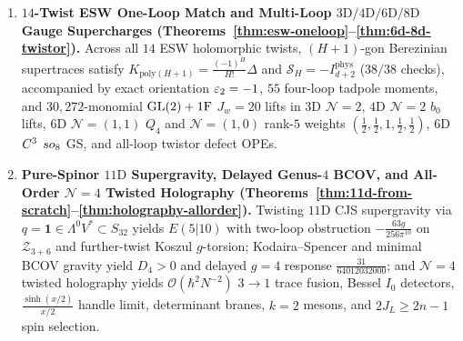\begin{enumerate}[label=\textbf{Result~\arabic*.},leftmargin=*]
  \item \textbf{$14$-Twist ESW One-Loop Match and Multi-Loop $3\mathrm{D}/4\mathrm{D}/6\mathrm{D}/8\mathrm{D}$ Gauge Supercharges (Theorems~\ref{thm:esw-oneloop}--\ref{thm:6d-8d-twistor}).} Across all $14$ ESW holomorphic twists, $(H+1)$-gon Berezinian supertraces satisfy $K_{\mathrm{poly}(H+1)} = \frac{(-1)^H}{H!}\Delta$ and $\mathcal{S}_H = -I^{\mathrm{phys}}_{d+2}$ ($38/38$ checks), accompanied by exact orientation $\varepsilon_2 = -1$, $55$ four-loop tadpole moments, and $30{,}272$-monomial $\operatorname{GL}(2)+1\mathrm{F}$ $J_w=20$ lifts in $3\mathrm{D}$ $\mathcal{N}=2$, $4\mathrm{D}$ $\mathcal{N}=2$ $b_0$ lifts, $6\mathrm{D}$ $\mathcal{N}=(1,1)$ $Q_4$ and $\mathcal{N}=(1,0)$ rank-$5$ weights $(\frac{1}{2},\frac{1}{2},1,\frac{1}{2},\frac{1}{2})$, $6\mathrm{D}$ $C^3$ $so_8$ GS, and all-loop twistor defect OPEs.

  \item \textbf{Pure-Spinor $11\mathrm{D}$ Supergravity, Delayed Genus-$4$ BCOV, and All-Order $\mathcal{N}=4$ Twisted Holography (Theorems~\ref{thm:11d-from-scratch}--\ref{thm:holography-allorder}).} Twisting $11\mathrm{D}$ CJS supergravity via $q = \mathbf{1} \in \Lambda^0 V^* \subset S_{32}$ yields $E(5|10)$ with two-loop obstruction $-\frac{63g}{256\pi^{10}}$ on $\mathcal{Z}_{3+6}$ and further-twist Koszul $g$-torsion; Kodaira--Spencer and minimal BCOV gravity yield $D_4 > 0$ and delayed $g=4$ response $\frac{31}{64012032000}$; and $\mathcal{N}=4$ twisted holography yields $\mathcal{O}(\hbar^2 N^{-2})$ $3\to 1$ trace fusion, Bessel $I_0$ detectors, $\frac{\sinh(x/2)}{x/2}$ handle limit, determinant branes, $k=2$ mesons, and $2J_L \ge 2n-1$ spin selection.
\end{enumerate}
